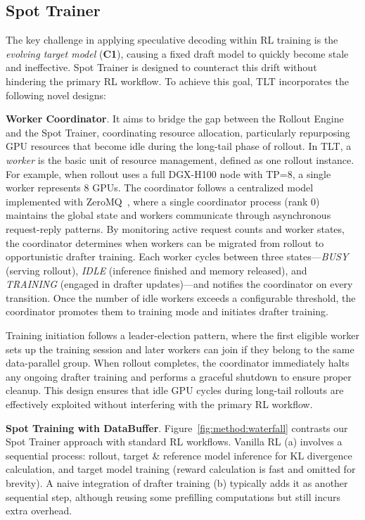 \documentclass[sigplan,screen]{acmart}
\newcommand{\SysName}{\textrm{TLT}\xspace}
\begin{document}
\subsection{Spot Trainer}
\label{subsec_spot_updater}

The key challenge in applying speculative decoding within RL training is the \emph{evolving target model} (\textbf{C1}), causing a fixed draft model to quickly become stale and ineffective. Spot Trainer is designed to counteract this drift without hindering the primary RL workflow. To achieve this goal, \SysName incorporates the following novel designs:


\noindent\textbf{Worker Coordinator}.
It aims to bridge the gap between the Rollout Engine and the Spot Trainer, coordinating resource allocation, particularly repurposing GPU resources that become idle during the long-tail phase of rollout. In \SysName, a \emph{worker} is the basic unit of resource management, defined as one rollout instance. For example, when rollout uses a full DGX-H100 node with TP=8, a single worker represents 8 GPUs. The coordinator follows a centralized model implemented with ZeroMQ~\cite{ZeroMQ}, where a single coordinator process (rank 0) maintains the global state and workers communicate through asynchronous request-reply patterns. By monitoring active request counts and worker states, the coordinator determines when workers can be migrated from rollout to opportunistic drafter training. Each worker cycles between three states—\emph{BUSY} (serving rollout), \emph{IDLE} (inference finished and memory released), and \emph{TRAINING} (engaged in drafter updates)—and notifies the coordinator on every transition. Once the number of idle workers exceeds a configurable threshold, the coordinator promotes them to training mode and initiates drafter training.

Training initiation follows a leader-election pattern, where the first eligible worker sets up the training session and later workers can join if they belong to the same data-parallel group. When rollout completes, the coordinator immediately halts any ongoing drafter training and performs a graceful shutdown to ensure proper cleanup. This design ensures that idle GPU cycles during long-tail rollouts are effectively exploited without interfering with the primary RL workflow.


\noindent\textbf{Spot Training with DataBuffer}.
Figure~\ref{fig:method:waterfall} contrasts our Spot Trainer approach with standard RL workflows. Vanilla RL (a) involves a sequential process: rollout, target \& reference model inference for KL divergence calculation, and target model training (reward calculation is fast and omitted for brevity). A naive integration of drafter training (b) typically adds it as another sequential step, although reusing some prefilling computations but still incurs extra overhead.
\end{document}
